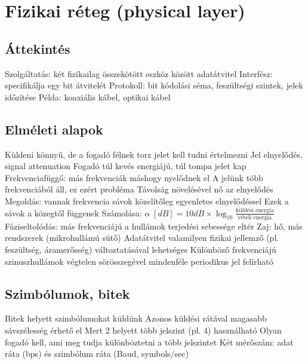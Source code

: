 \documentclass[12pt,a4paper]{article}
\begin{document}
\pagebreak

\section{Fizikai réteg (physical layer)}

\subsection{Áttekintés}

\begin{outline}
	\1 Szolgáltatás: két fizikailag összekötött eszköz között adatátvitel
	\1 Interfész: specifikálja egy bit átvitelét
	\1 Protokoll: bit kódolási séma, feszültségi szintek, jelek időzítése
	\1 Példa: koaxiális kábel, optikai kábel
\end{outline}

\subsection{Elméleti alapok}

\begin{outline}
	\1 Küldeni könnyű, de a fogadó félnek torz jelet kell tudni értelmezni
	\1 Jel elnyelődés, signal attenuation
		\2 Fogadó túl kevés energiájú, túl tompa jelet kap
		\2 Frekvenciafüggő: más frekvenciák máshogy nyelődnek el
			\3 A jelünk több frekvenciából áll, ez ezért probléma
		\2 Távolság növelésével nő az elnyelődés
		\2 Megoldás: vannak frekvencia sávok közelítőleg egyenletes elnyelődéssel
			\3 Ezek a sávok a közegtől függenek
		\2 Számolása: $\alpha \; [dB] = 10 dB \times \log_{10} \frac{\text{küldési energia}}{\text{vételi energia}}$
	\1 Fáziseltolódás: más frekvenciájú a hullámok terjedési sebessége eltér
	\1 Zaj: hő, más rendszerek (mikrohullámú sütő)
	\1 Adatátvitel valamilyen fizikai jellemző (pl. feszültség, áramerősség) változtatásával lehetséges
		\2 Különböző frekvenciájú szinuszhullámok végtelen sörösszegével mindenféle periodikus jel felírható
\end{outline}

\pagebreak

\subsection{Szimbólumok, bitek}

\begin{outline}
	\1 Bitek helyett szimbólumokat küldünk
	\1 Azonos küldési rátával magasabb sávszélesség érhető el
		\2 Mert 2 helyett több jelszint (pl. 4) használható
		\2 Olyan fogadó kell, ami meg tudja különböztetni a több jelszintet
	\1 Két mérőszám: adat ráta (bps) és szimbólum ráta (Baud, symbols/sec)
\end{outline}
\end{document}
